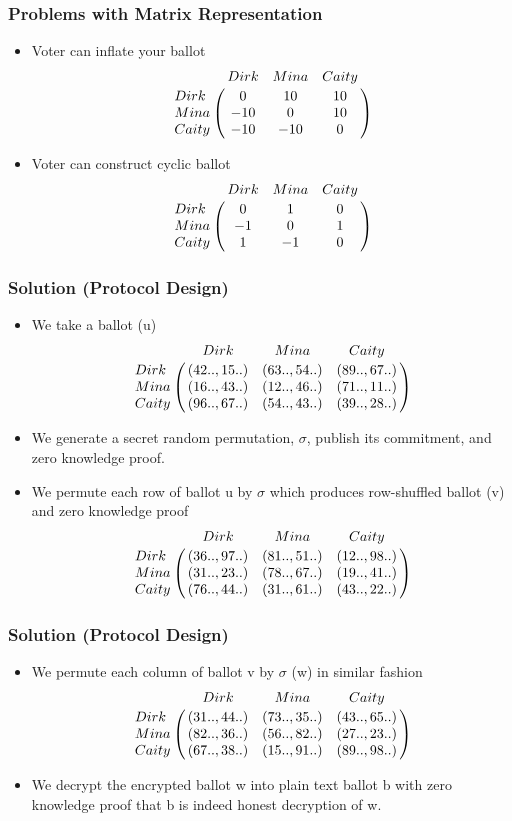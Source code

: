 \documentclass{beamer}
\begin{document}
\begin{frame}
\frametitle{Problems with Matrix Representation}
\begin{itemize}
\item Voter can inflate your ballot
$$\bordermatrix{\text{}& Dirk & Mina & Caity \cr
                Dirk & 0 &  10 & 10\cr
                Mina & -10 &  0 & 10\cr
                Caity & -10 &  -10 & 0}$$ \pause
         
\item Voter can construct cyclic ballot
$$\bordermatrix{\text{}& Dirk & Mina & Caity \cr
                Dirk & 0 &  1 & 0\cr
                Mina & -1 &  0 & 1\cr
                Caity & 1 & -1 & 0}$$
                
\end{itemize}
                
\end{frame}

\begin{frame}
\frametitle{Solution (Protocol Design)}
\begin{itemize}
\item We take a ballot (u)
$$\bordermatrix{\text{}& Dirk & Mina & Caity \cr
                Dirk & (42.., 15..) & (63.., 54..) & (89.., 67..)\cr
                Mina & (16.., 43..) & (12.., 46..) & (71.., 11..)\cr
                Caity & (96.., 67..) & (54.., 43..) & (39.., 28..)}$$ \pause
              
\item We generate a secret random 
	  permutation, $\sigma$, publish its commitment, 
	  and zero knowledge proof. \pause

\item We permute each row of ballot u by $\sigma$ which produces row-shuffled
      ballot (v) and zero knowledge proof 
 $$\bordermatrix{\text{}& Dirk & Mina & Caity \cr
                Dirk & (36.., 97..) & (81.., 51..) & (12.., 98..)\cr
                Mina & (31.., 23..) & (78.., 67..) & (19.., 41..)\cr
                Caity & (76.., 44..) & (31.., 61..) & (43.., 22..)}$$ 
\end{itemize}
\end{frame} 

\begin{frame}
\frametitle{Solution (Protocol Design)}
\begin{itemize}
\item We permute each column of ballot v by $\sigma$ (w) in similar fashion   
 $$\bordermatrix{\text{}& Dirk & Mina & Caity \cr
                Dirk & (31.., 44..) & (73.., 35..) & (43.., 65..)\cr
                Mina & (82.., 36..) & (56.., 82..) & (27.., 23..)\cr
                Caity & (67.., 38..) & (15.., 91..) & (89.., 98..)}$$ 

\item We decrypt the encrypted ballot w into plain text ballot b with 
	  zero knowledge proof that b is indeed honest decryption of w.

\end{itemize}
\end{frame}
\end{document}
